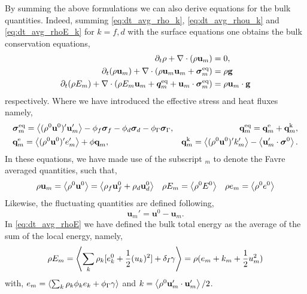 By summing the above formulations we can also derive equations for the bulk quantities. 
Indeed, summing \ref{eq:dt_avg_rho_k}, \ref{eq:dt_avg_rhou_k} and \ref{eq:dt_avg_rhoE_k} for $k=f,d$ with the surface equations one obtains the bulk conservation equations, 
\begin{align}
    \label{eq:dt_avg_rho}
    \pddt \rho 
    + \div (
         \rho \textbf{u}_m
    )
    &= 
    0,\\
    \label{eq:dt_avg_rhou_m}
    \pddt ( \rho\textbf{u}_m)  
    + \div (
         \rho\textbf{u}_m\textbf{u}_m
        + \bm{\sigma}^\text{eq}_m
    )
    &= 
     \rho \textbf{g} \\
    \label{eq:dt_avg_rhoE}
    \pddt (\rho E_m)  
    + \div (
        \rho E_m \textbf{u}_m
        + \bm{q}^\text{eq}_m
        + \textbf{u}_m \cdot \bm{\sigma}^\text{eq}_m
        )
    &= 
     \rho \textbf{u}_m  \cdot \textbf{g} 
\end{align} 
respectively. 
Where we have introduced the effective stress and heat fluxes namely, 
\begin{align*}
    &\bm{\sigma}^\text{eq}_m
    = 
    \avg{ (\rho^0\textbf{u}^0)' \textbf{u}'_m}
      - \phi_f\bm\sigma_f
      - \phi_d\bm\sigma_d
      - \phi_\Gamma\bm\sigma_\Gamma,%
    &\textbf{q}^\text{eq}_m
    =\textbf{q}^\text{e}_m +\textbf{q}^\text{k}_m,  \\
    &\textbf{q}^\text{e}_m
    = \avg{(\rho^0\textbf{u}^0)' e_m'} 
    + \phi\textbf{q}_m,
    &\textbf{q}^\text{k}_m
    = \avg{(\rho^0 \textbf{u}^0)' k_m'} 
    - \avg{ \textbf{u}_m' \cdot \bm{\sigma}^0}.
\end{align*}
In these equations, we have made use of the subscript $_m$ to denote the Favre averaged quantities, such that, 
\begin{align*}
    \rho \textbf{u}_m
    = \left<\rho^0 \textbf{u}^0\right>
    = \left<\rho_f \textbf{u}^0_f
    + \rho_d \textbf{u}_d^0\right>
    &&
    \rho E_m
    = \left<\rho^0 E^0\right>
    &&
    \rho e_m
    = \left<\rho^0 e^0\right>
\end{align*}
Likewise, the fluctuating quantities are defined following, 
\begin{equation}
    \textbf{u}_m'
    = \textbf{u}^0 - \textbf{u}_m.
\end{equation}
In \ref{eq:dt_avg_rhoE} we have defined the bulk total energy as the average of the sum of the local energy, namely, 
\begin{equation}
    \rho E_m = \left<\sum_k \rho_k [e_k^0 + \frac{1}{2}(u_k)^2] 
    + \delta_I \gamma\right>
    = \rho( e_m +  k_m + \frac{1}{2}u_m^2)
\end{equation}
with, $e_m = \left<\sum_k \rho_k\phi_k e_k + \phi_\Gamma \gamma\right>$ and $k = \left<\rho^0 \textbf{u}_m'\cdot \textbf{u}_m'\right>/2$. 

